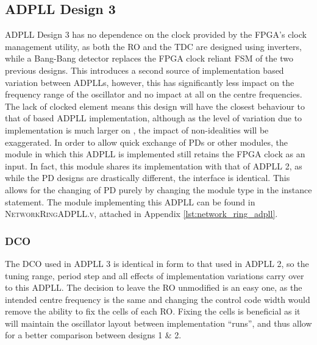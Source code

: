 \subsection{\acs{ADPLL} Design 3}
\acs{ADPLL} Design 3 has no dependence on the clock provided by the \ac{FPGA}'s clock management utility, as both the \ac{RO} and the \ac{TDC} are designed using inverters, while a Bang-Bang detector replaces the \ac{FPGA} clock reliant \ac{FSM} of the two previous designs. This introduces a second source of implementation based variation between \acp{ADPLL}, however, this has significantly less impact on the frequency range of the oscillator and no impact at all on the centre frequencies. The lack of  clocked element means this design will have the closest behaviour to that of  based \ac{ADPLL} implementation, although as the level of variation due to implementation is much larger on , the impact of non-idealities will be exaggerated.
In order to allow quick exchange of \acp{PD} or other modules, the module in which this \ac{ADPLL} is implemented still retains the \ac{FPGA} clock as an input. In fact, this module shares its implementation with that of \ac{ADPLL} 2, as while the \ac{PD} designs are drastically different, the interface is identical. This allows for the changing of \ac{PD} purely by changing the module type in the instance statement. The module implementing this \ac{ADPLL} can be found in \textsc{NetworkRingADPLL.v}, attached in Appendix \ref{lst:network_ring_adpll}.

\subsubsection{\acl{DCO}}
The \ac{DCO} used in \ac{ADPLL} 3 is identical in form to that used in \ac{ADPLL} 2, so the tuning range, period step and all effects of implementation variations carry over to this \ac{ADPLL}. The decision to leave the \ac{RO} unmodified is an easy one, as the intended centre frequency is the same and changing the control code width would remove the ability to fix the cells of each \ac{RO}. Fixing the cells is beneficial as it will maintain the oscillator layout between implementation ``runs'', and thus allow for a better comparison between designs 1 \& 2.

